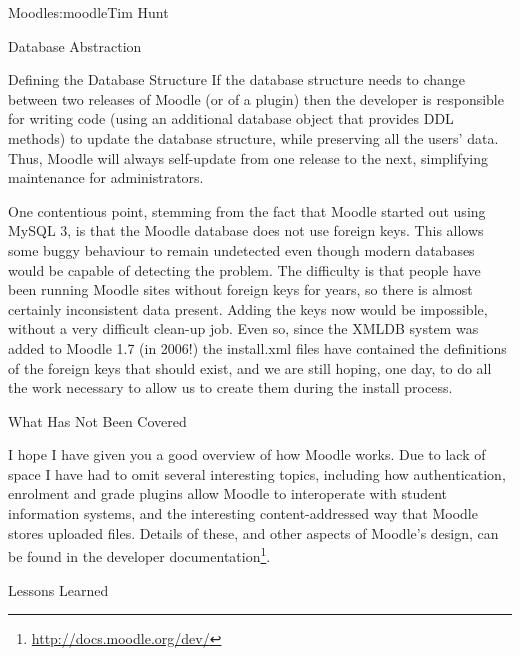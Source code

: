 \begin{aosachapter}{Moodle}{s:moodle}{Tim Hunt}
\begin{aosasect1}{Database Abstraction}
\begin{aosasect2}{Defining the Database Structure}
If the database structure needs to change between two releases of
Moodle (or of a plugin) then the developer is responsible for writing
code (using an additional database object that provides DDL methods)
to update the database structure, while preserving all the users'
data. Thus, Moodle will always self-update from one release to the
next, simplifying maintenance for administrators.

One contentious point, stemming from the fact that Moodle started out
using MySQL 3, is that the Moodle database does not use foreign
keys. This allows some buggy behaviour to remain undetected even
though modern databases would be capable of detecting the problem. The
difficulty is that people have been running Moodle sites without
foreign keys for years, so there is almost certainly inconsistent data
present. Adding the keys now would be impossible, without a
very difficult clean-up job. Even so, since the XMLDB system was added
to Moodle 1.7 (in 2006!) the install.xml files have contained the
definitions of the foreign keys that should exist, and we are still
hoping, one day, to do all the work necessary to allow us to create
them during the install process.

\end{aosasect2}

\end{aosasect1}

\begin{aosasect1}{What Has Not Been Covered}

I hope I have given you a good overview of how Moodle works. Due to
lack of space I have had to omit several interesting topics, including
how authentication, enrolment and grade plugins allow Moodle to
interoperate with student information systems, and the interesting
content-addressed way that Moodle stores uploaded files. Details of
these, and other aspects of Moodle's design, can be found in the
developer documentation\footnote{\url{http://docs.moodle.org/dev/}}.

\end{aosasect1}

\begin{aosasect1}{Lessons Learned}


\end{aosasect1}
\end{aosachapter}

